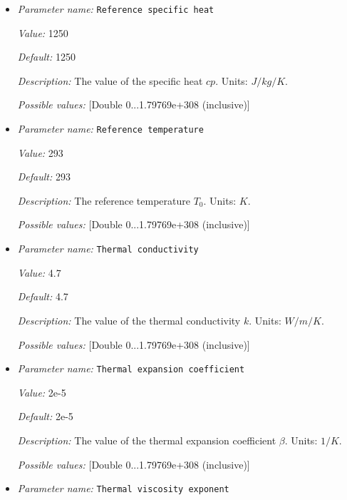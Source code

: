 \begin{itemize}
{\it Value:} 3300


{\it Default:} 3300


{\it Description:} Reference density $\rho_0$. Units: $kg/m^3$.


{\it Possible values:} [Double 0...1.79769e+308 (inclusive)]
\item {\it Parameter name:} {\tt Reference specific heat}


{\it Value:} 1250


{\it Default:} 1250


{\it Description:} The value of the specific heat $cp$. Units: $J/kg/K$.


{\it Possible values:} [Double 0...1.79769e+308 (inclusive)]
\item {\it Parameter name:} {\tt Reference temperature}


{\it Value:} 293


{\it Default:} 293


{\it Description:} The reference temperature $T_0$. Units: $K$.


{\it Possible values:} [Double 0...1.79769e+308 (inclusive)]
\item {\it Parameter name:} {\tt Thermal conductivity}


{\it Value:} 4.7


{\it Default:} 4.7


{\it Description:} The value of the thermal conductivity $k$. Units: $W/m/K$.


{\it Possible values:} [Double 0...1.79769e+308 (inclusive)]
\item {\it Parameter name:} {\tt Thermal expansion coefficient}


{\it Value:} 2e-5


{\it Default:} 2e-5


{\it Description:} The value of the thermal expansion coefficient $\beta$. Units: $1/K$.


{\it Possible values:} [Double 0...1.79769e+308 (inclusive)]
\item {\it Parameter name:} {\tt Thermal viscosity exponent}



\end{itemize}
